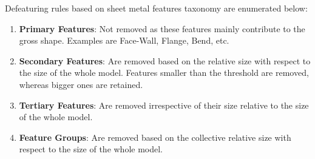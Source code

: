 Defeaturing rules based on sheet metal features taxonomy are enumerated below:
\begin{enumerate}
[noitemsep,topsep=2pt,parsep=2pt,partopsep=2pt, leftmargin=*]
\item \textbf{Primary Features}: Not removed as these features mainly contribute to the gross shape. Examples are  Face-Wall, Flange, Bend, etc.
\item \textbf{Secondary Features}: Are removed based on the relative size with respect to the size of the whole model. Features smaller than the threshold are removed, whereas bigger ones are retained.
	
\item \textbf{Tertiary Features}: Are removed irrespective of their size relative to the size of the whole model. 
	
		
\item \textbf{Feature Groups}: Are removed based on the collective relative size with respect to the size of the whole model. 
\end{enumerate}

